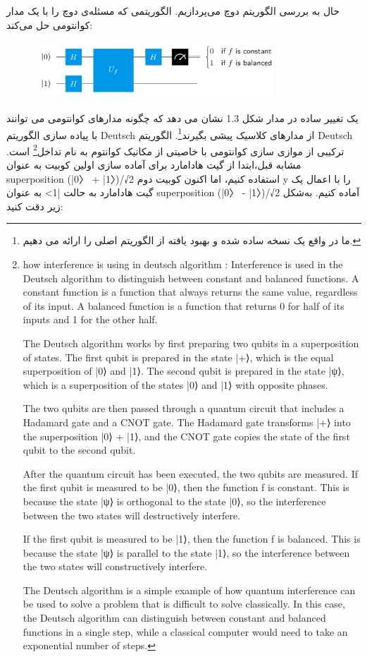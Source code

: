 \documentclass{book}
\begin{document}
حال به بررسی الگوریتم دوچ می‌پردازیم. الگوریتمی که مسئله‌ی دوچ را با یک مدار کوانتومی حل می‌کند:\\
\begin{center}
\begin{figure}[ht]
	\centering
	\includegraphics[width=0.8\textwidth]{Deutsch algorithm.png}
	\caption{}
\end{figure}
\end{center}

 
یک تغییر ساده در مدار شکل 1.3 نشان می دهد که چگونه مدارهای کوانتومی می توانند با پیاده سازی الگوریتم Deutsch از مدارهای کلاسیک پیشی بگیرند\footnote{ما در واقع یک نسخه ساده شده و بهبود یافته از الگوریتم اصلی را ارائه می دهیم.}. الگوریتم Deutsch ترکیبی از موازی سازی کوانتومی با خاصیتی از مکانیک کوانتوم به نام تداخل\footnote{how interference is using in deutsch algorithm : Interference is used in the Deutsch algorithm to distinguish between constant and balanced functions. A constant function is a function that always returns the same value, regardless of its input. A balanced function is a function that returns 0 for half of its inputs and 1 for the other half.
	
	The Deutsch algorithm works by first preparing two qubits in a superposition of states. The first qubit is prepared in the state |+⟩, which is the equal superposition of |0⟩ and |1⟩. The second qubit is prepared in the state |ψ⟩, which is a superposition of the states |0⟩ and |1⟩ with opposite phases.
	
	The two qubits are then passed through a quantum circuit that includes a Hadamard gate and a CNOT gate. The Hadamard gate transforms |+⟩ into the superposition |0⟩ + |1⟩, and the CNOT gate copies the state of the first qubit to the second qubit.
	
	After the quantum circuit has been executed, the two qubits are measured. If the first qubit is measured to be |0⟩, then the function f is constant. This is because the state |ψ⟩ is orthogonal to the state |0⟩, so the interference between the two states will destructively interfere.
	
	If the first qubit is measured to be |1⟩, then the function f is balanced. This is because the state |ψ⟩ is parallel to the state |1⟩, so the interference between the two states will constructively interfere.
	
	The Deutsch algorithm is a simple example of how quantum interference can be used to solve a problem that is difficult to solve classically. In this case, the Deutsch algorithm can distinguish between constant and balanced functions in a single step, while a classical computer would need to take an exponential number of steps.} است.
مشابه قبل،‌ابتدا از گیت هادامارد برای آماده سازی اولین کوبیت به عنوان superposition (|0〉 + |1〉)/√2 استفاده کنیم، اما اکنون کوبیت دوم y را با اعمال یک گیت هادامارد به حالت |1> به عنوان superposition (|0〉 - |1〉)/√2 آماده کنیم. به‌شکل زیر دقت کنید:
\end{document}
